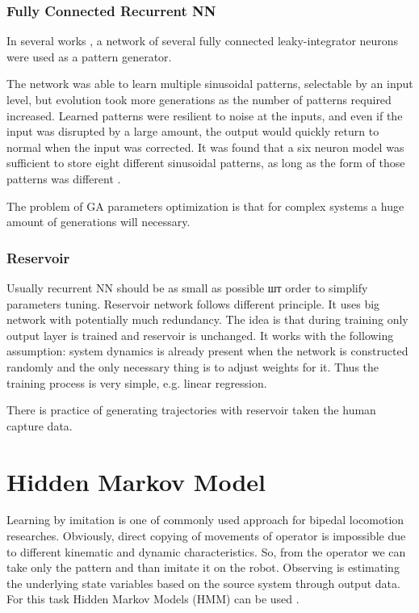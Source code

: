 \documentclass[12pt,a4paper]{report}
\begin{document}
				\subsubsection{Fully Connected Recurrent NN}
					In several works \cite{reil2002evolution}, \cite{petridis1994recurrent} a network of several fully connected leaky-integrator neurons were used as a pattern generator. 
					
					The network was able to learn multiple sinusoidal patterns, selectable by an input level, but evolution took more generations as the number of patterns required increased. Learned patterns were resilient to noise at the inputs, and even if the input was disrupted by a large amount, the output would quickly return to normal when the input was corrected. It was found that a six neuron model was sufficient to store eight different sinusoidal patterns, as long as the form of those patterns was different \cite{wright2014intelligent}.
					
					The problem of GA parameters optimization is that for complex systems a huge amount of generations will necessary. 
				\subsubsection{Reservoir}
					Usually recurrent NN should be as small as possible шт order to simplify parameters tuning. Reservoir network follows different principle. It uses big network with potentially much redundancy. The idea is that during training only output layer is trained and reservoir is unchanged. It works with the following assumption: system dynamics is already present when the network is constructed randomly and the only necessary thing is to adjust weights for it. Thus the training process is very simple, e.g. linear regression.
					
					There is practice \cite{wyffels2009design} of generating trajectories with reservoir taken the human capture data.
		\section{Hidden Markov Model}
			Learning by imitation is one of commonly used approach for bipedal locomotion researches. Obviously, direct copying of movements of operator is impossible due to different kinematic and dynamic characteristics. So, from the operator we can take only the pattern and than imitate it on the robot. Observing is estimating the underlying state variables based on the source system through output data. For this task Hidden Markov Models (HMM) can be used \cite{inamura2004embodied}. 
			
\end{document}
